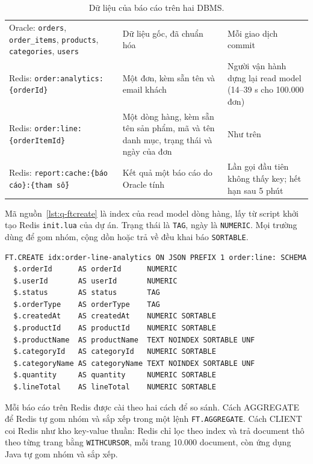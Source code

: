 \begin{table}[!htbp]
\centering
\caption{Dữ liệu của báo cáo trên hai DBMS.}\label{tab:q-data}
\reporttablesetup
\begin{tabularx}{\linewidth}{|P{4.2cm}|L|P{4cm}|}
\hline
{}
 &  &  \\ \hline
Oracle: \texttt{orders}, \texttt{order\_items}, \texttt{products}, \texttt{categories}, \texttt{users} & Dữ liệu gốc, đã chuẩn hóa & Mỗi giao dịch commit \\ \hline
Redis: \texttt{order:analytics:}\allowbreak\texttt{\{orderId\}} & Một đơn, kèm sẵn tên và email khách & Người vận hành dựng lại read model (14--39 s cho 100.000 đơn) \\ \hline
Redis: \texttt{order:line:}\allowbreak\texttt{\{orderItemId\}} & Một dòng hàng, kèm sẵn tên sản phẩm, mã và tên danh mục, trạng thái và ngày của đơn & Như trên \\ \hline
Redis: \texttt{report:cache:}\allowbreak\texttt{\{báo cáo\}:}\allowbreak\texttt{\{tham số\}} & Kết quả một báo cáo do Oracle tính & Lần gọi đầu tiên không thấy key; hết hạn sau 5 phút \\ \hline
\end{tabularx}
\end{table}

Mã nguồn~\ref{lst:q-ftcreate} là index của read model dòng hàng, lấy từ script khởi tạo Redis \texttt{init.lua} của dự án. Trạng thái là \texttt{TAG}, ngày là \texttt{NUMERIC}. Mọi trường dùng để gom nhóm, cộng dồn hoặc trả về đều khai báo \texttt{SORTABLE}.

\reportblockspace{72pt}
\begin{lstlisting}[language=Redis,caption={Index RediSearch của read model dòng hàng.},label={lst:q-ftcreate}]
FT.CREATE idx:order-line-analytics ON JSON PREFIX 1 order:line: SCHEMA
  $.orderId      AS orderId      NUMERIC
  $.userId       AS userId       NUMERIC
  $.status       AS status       TAG
  $.orderType    AS orderType    TAG
  $.createdAt    AS createdAt    NUMERIC SORTABLE
  $.productId    AS productId    NUMERIC SORTABLE
  $.productName  AS productName  TEXT NOINDEX SORTABLE UNF
  $.categoryId   AS categoryId   NUMERIC SORTABLE
  $.categoryName AS categoryName TEXT NOINDEX SORTABLE UNF
  $.quantity     AS quantity     NUMERIC SORTABLE
  $.lineTotal    AS lineTotal    NUMERIC SORTABLE
\end{lstlisting}

Mỗi báo cáo trên Redis được cài theo hai cách để so sánh. Cách AGGREGATE để Redis tự gom nhóm và sắp xếp trong một lệnh \texttt{FT.AGGREGATE}. Cách CLIENT coi Redis như kho key-value thuần: Redis chỉ lọc theo index và trả document thô theo từng trang bằng \texttt{WITHCURSOR}, mỗi trang 10.000 document, còn ứng dụng Java tự gom nhóm và sắp xếp.

